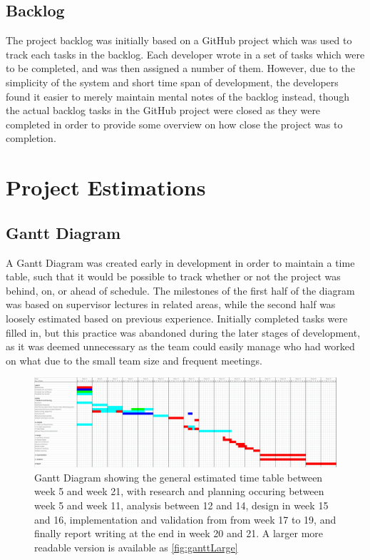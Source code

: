 \subsection{Backlog}

The project backlog was initially based on a GitHub project\cite{githubprojects} which was used to track each tasks in the backlog. Each developer wrote in a set of tasks which were to be completed, and was then assigned a number of them. However, due to the simplicity of the system and short time span of development, the developers found it easier to merely maintain mental notes of the backlog instead, though the actual backlog tasks in the GitHub project were closed as they were completed in order to provide some overview on how close the project was to completion.

\section{Project Estimations}

\subsection{Gantt Diagram}

A Gantt Diagram was created early in development in order to maintain a time table, such that it would be possible to track whether or not the project was behind, on, or ahead of schedule. The milestones of the first half of the diagram was based on supervisor lectures in related areas, while the second half was loosely estimated based on previous experience. Initially completed tasks were filled in, but this practice was abandoned during the later stages of development, as it was deemed unnecessary as the team could easily manage who had worked on what due to the small team size and frequent meetings.

\begin{figure}[ht]
    \centering
    \includegraphics[width=\textwidth]{Pictures/Gantt.png}
    \caption{Gantt Diagram showing the general estimated time table between week 5 and week 21, with research and planning occuring between week 5 and week 11, analysis between 12 and 14, design in week 15 and 16, implementation and validation from from week 17 to 19, and finally report writing at the end in week 20 and 21. A larger more readable version is available as \ref{fig:ganttLarge}}
    \label{fig:gantt}
\end{figure}


